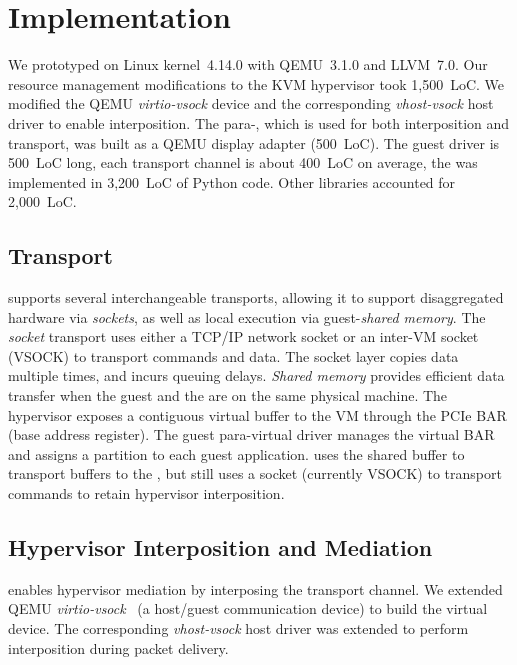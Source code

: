 
\section{Implementation}
\label{s:impl}

We prototyped \AvA on Linux kernel~4.14.0 with QEMU~3.1.0 and LLVM~7.0.
Our resource management modifications to the KVM hypervisor took 1,500~LoC.
We modified the QEMU \emph{virtio-vsock} device and the corresponding
\emph{vhost-vsock} host driver to enable interposition. The para-\vdev, which
is used for both interposition and transport, was built as a QEMU display
adapter (500~LoC). The guest driver is 500~LoC long, each transport channel is
about 400~LoC on average, the \CAvA was implemented in 3,200~LoC of Python
code. Other libraries accounted for 2,000~LoC.

\subsection{Transport}
\AvA supports several interchangeable transports, allowing it to support
disaggregated hardware via \emph{sockets}, as well as local execution via
guest-\worker \emph{shared memory}. The \emph{socket} transport uses either a
TCP/IP network socket or an inter-VM socket (VSOCK) to transport commands and
data. The socket layer copies data multiple times, and incurs queuing delays.
\emph{Shared memory} provides efficient data transfer when the guest and the
\worker are on the same physical machine. The hypervisor exposes a contiguous
virtual buffer to the VM through the \vdev PCIe BAR (base address register).
The guest para-virtual driver manages the virtual BAR and assigns a partition
to each guest application. \AvA uses the shared buffer to transport buffers to
the \worker, but still uses a socket (currently VSOCK) to transport commands
to retain hypervisor interposition.

\subsection{Hypervisor Interposition and Mediation}
\AvA enables hypervisor mediation by interposing the transport channel.
We extended QEMU \emph{virtio-vsock}~\cite{virtio,virtio_vsock} (a host/guest
communication device) to build the virtual device. The corresponding
\emph{vhost-vsock} host driver was extended to perform interposition during
packet delivery.

